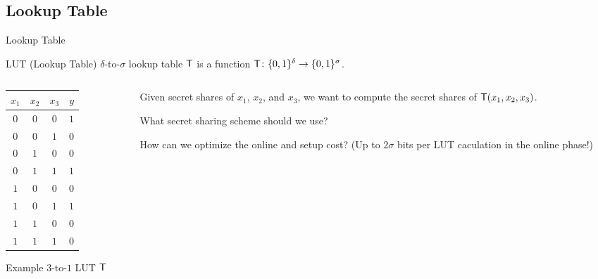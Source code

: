 \documentclass[../240906_cryptlab_flute.tex]{subfiles}
\begin{document}
\subsection{Lookup Table}
\begin{frame}{Lookup Table}
    \begin{block}{LUT (Lookup Table)}
        \(\delta\)-to-\(\sigma\) lookup table \(\mathsf{T}\) is a function
        \(\mathsf{T} \colon \{0,1\}^\delta \to \{0,1\}^\sigma\).
    \end{block}
    \def\onlyred{}
    \begin{columns}
        \begin{column}{.35\textwidth}
            \centering
            \begin{table}[H]
                \begin{tabular}{ccc|c}
                    \(x_1\)       & \(x_2\)       & \(x_3\)       & \(y\)         \\ \hline
                    \onlyred\(0\) & \onlyred\(0\) & \onlyred\(0\) & \onlyred\(1\) \\
                    \(0\)         & \(0\)         & \(1\)         & \(0\)         \\
                    \(0\)         & \(1\)         & \(0\)         & \(0\)         \\
                    \onlyred\(0\) & \onlyred\(1\) & \onlyred\(1\) & \onlyred\(1\) \\
                    \(1\)         & \(0\)         & \(0\)         & \(0\)         \\
                    \onlyred\(1\) & \onlyred\(0\) & \onlyred\(1\) & \onlyred\(1\) \\
                    \(1\)         & \(1\)         & \(0\)         & \(0\)         \\
                    \(1\)         & \(1\)         & \(1\)         & \(0\)
                \end{tabular}
            \end{table}
            Example \(3\)-to-\(1\) LUT \(\mathsf{T}\)
        \end{column}
        \pause
        \begin{column}{.65\textwidth}
            \begin{description}[Question]
                \item[Goal]
                Given secret shares of \(x_1\), \(x_2\), and \(x_3\),
                we want to compute the secret shares of \(\mathsf{T}(x_1, x_2, x_3)\).
                \pause
                \item[Question]
                What secret sharing scheme should we use?
                \item[Question]
                How can we optimize the online and setup cost?
                \pause
                (Up to \alert{\(2\sigma\) bits per LUT caculation} in the online phase!)
            \end{description}
        \end{column}
    \end{columns}
\end{frame}
\end{document}
